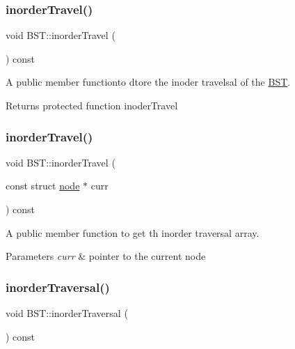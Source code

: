 \subsubsection{\texorpdfstring{inorder\+Travel()}{inorderTravel()}\hspace{0.1cm}{\footnotesize\ttfamily [1/2]}}
{\footnotesize\ttfamily void B\+S\+T\+::inorder\+Travel (\begin{DoxyParamCaption}{ }\end{DoxyParamCaption}) const\hspace{0.3cm}{\ttfamily [inline]}}



A public member functionto dtore the inoder travelsal of the \hyperlink{classBST}{B\+ST}. 

\begin{DoxyReturn}{Returns}
protected function inoder\+Travel 
\end{DoxyReturn}
\mbox{\label{classBST_ab26627cb83fe02abc1940e61b5b32048}} 
\subsubsection{\texorpdfstring{inorder\+Travel()}{inorderTravel()}\hspace{0.1cm}{\footnotesize\ttfamily [2/2]}}
{\footnotesize\ttfamily void B\+S\+T\+::inorder\+Travel (\begin{DoxyParamCaption}\item[{const struct \hyperlink{structnode}{node} $\ast$}]{curr }\end{DoxyParamCaption}) const\hspace{0.3cm}{\ttfamily [protected]}}



A public member function to get th inorder traversal array. 


\begin{DoxyParams}{Parameters}
{\em curr} & pointer to the current node \\
\hline
\end{DoxyParams}
\mbox{\label{classBST_ac2be220d080c4ca19f5741a0a8458837}} 
\subsubsection{\texorpdfstring{inorder\+Traversal()}{inorderTraversal()}\hspace{0.1cm}{\footnotesize\ttfamily [1/2]}}
{\footnotesize\ttfamily void B\+S\+T\+::inorder\+Traversal (\begin{DoxyParamCaption}{ }\end{DoxyParamCaption}) const\hspace{0.3cm}{\ttfamily [inline]}}



